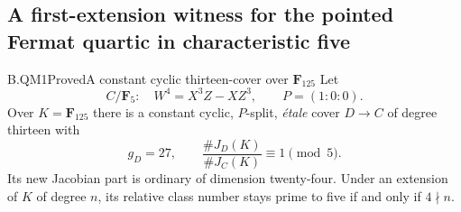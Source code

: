 \subsection{A first-extension witness for the pointed Fermat quartic in characteristic five}

\begin{claim}{B.QM1}{Proved}{A constant cyclic thirteen-cover over \(\mathbf F_{125}\)}
Let
\[
 C/\mathbf F_5:\quad W^4=X^3Z-XZ^3,\qquad P=(1:0:0).
\]
Over $K=\mathbf F_{125}$ there is a constant cyclic, $P$-split,
\emph{\'etale} cover $D\to C$ of degree thirteen with
\[
  g_D=27,\qquad
  \frac{\#J_D(K)}{\#J_C(K)}\equiv1\pmod5.
\]
Its new Jacobian part is ordinary of dimension twenty-four.
Under an extension of $K$ of degree $n$, its relative class
number stays prime to five if and only if $4\nmid n$.
\end{claim}
